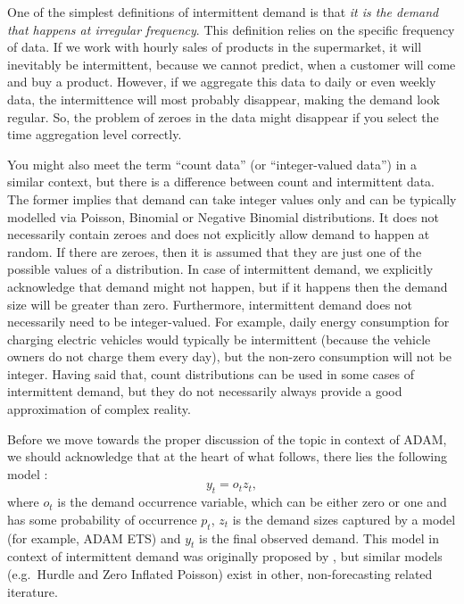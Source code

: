 \documentclass[
]{book}
\theoremstyle{definition}
\theoremstyle{definition}
\theoremstyle{definition}
\theoremstyle{definition}
\theoremstyle{remark}
\begin{document}
One of the simplest definitions of intermittent demand is that \emph{it is the demand that happens at irregular frequency}. This definition relies on the specific frequency of data. If we work with hourly sales of products in the supermarket, it will inevitably be intermittent, because we cannot predict, when a customer will come and buy a product. However, if we aggregate this data to daily or even weekly data, the intermittence will most probably disappear, making the demand look regular. So, the problem of zeroes in the data might disappear if you select the time aggregation level correctly.

You might also meet the term ``count data'' (or ``integer-valued data'') in a similar context, but there is a difference between count and intermittent data. The former implies that demand can take integer values only and can be typically modelled via Poisson, Binomial or Negative Binomial distributions. It does not necessarily contain zeroes and does not explicitly allow demand to happen at random. If there are zeroes, then it is assumed that they are just one of the possible values of a distribution. In case of intermittent demand, we explicitly acknowledge that demand might not happen, but if it happens then the demand size will be greater than zero. Furthermore, intermittent demand does not necessarily need to be integer-valued. For example, daily energy consumption for charging electric vehicles would typically be intermittent (because the vehicle owners do not charge them every day), but the non-zero consumption will not be integer. Having said that, count distributions can be used in some cases of intermittent demand, but they do not necessarily always provide a good approximation of complex reality.

Before we move towards the proper discussion of the topic in context of ADAM, we should acknowledge that at the heart of what follows, there lies the following model \citep{Croston1972}:
\begin{equation}
  y_t = o_t z_t ,
  \label{eq:IntermittentDemandModel}
\end{equation}
where \(o_t\) is the demand occurrence variable, which can be either zero or one and has some probability of occurrence \(p_t\), \(z_t\) is the demand sizes captured by a model (for example, ADAM ETS) and \(y_t\) is the final observed demand. This model in context of intermittent demand was originally proposed by \citet{Croston1972}, but similar models (e.g.~Hurdle and Zero Inflated Poisson) exist in other, non-forecasting related iterature.
\end{document}
